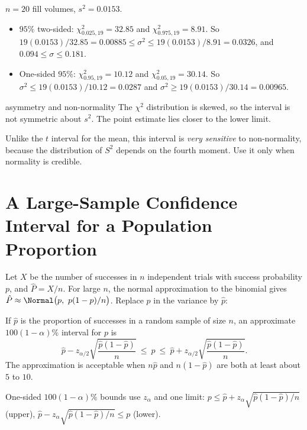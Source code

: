 \begin{example}
$n=20$ fill volumes, $s^2=0.0153$.
\begin{itemize}
  \item $95\%$ two-sided: $\chi^2_{0.025,19}=32.85$ and $\chi^2_{0.975,19}=8.91$. So $19(0.0153)/32.85=0.00885\le\sigma^2\le19(0.0153)/8.91=0.0326$, and $0.094\le\sigma\le0.181$.
  \item One-sided $95\%$: $\chi^2_{0.95,19}=10.12$ and $\chi^2_{0.05,19}=30.14$. So $\sigma^2\le19(0.0153)/10.12=0.0287$ and $\sigma^2\ge19(0.0153)/30.14=0.00965$.
\end{itemize}
\end{example}

\begin{nuance}{asymmetry and non-normality}
The $\chi^2$ distribution is skewed, so the interval is not symmetric about $s^2$. The point estimate lies closer to the lower limit.

Unlike the $t$ interval for the mean, this interval is \emph{very sensitive} to non-normality, because the distribution of $S^2$ depends on the fourth moment. Use it only when normality is credible.
\end{nuance}

\section{A Large-Sample Confidence Interval for a Population Proportion}

Let $X$ be the number of successes in $n$ independent trials with success probability $p$, and $\hat{P}=X/n$. For large $n$, the normal approximation to the binomial gives $\hat{P}\approx\Normal\big(p,\ p(1-p)/n\big)$. Replace $p$ in the variance by $\hat{p}$:

\begin{theorem}\label{thm:prop-ci}
If $\hat{p}$ is the proportion of successes in a random sample of size $n$, an approximate $100(1-\alpha)\%$ interval for $p$ is
\[ \hat{p}-z_{\alpha/2}\sqrt{\frac{\hat{p}(1-\hat{p})}n}\ \le\ p\ \le\ \hat{p}+z_{\alpha/2}\sqrt{\frac{\hat{p}(1-\hat{p})}n}. \]
The approximation is acceptable when $n\hat{p}$ and $n(1-\hat{p})$ are both at least about $5$ to $10$.

One-sided $100(1-\alpha)\%$ bounds use $z_\alpha$ and one limit: $p\le\hat{p}+z_\alpha\sqrt{\hat{p}(1-\hat{p})/n}$ (upper), $\hat{p}-z_\alpha\sqrt{\hat{p}(1-\hat{p})/n}\le p$ (lower).
\end{theorem}

